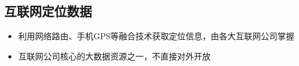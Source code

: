 \subsection{互联网定位数据}

\begin{frame}[t]{\subsecname}
\begin{itemize}
\item 利用网络路由、手机GPS等融合技术获取定位信息，由各大互联网公司掌握
\item 互联网公司核心的大数据资源之一，不直接对外开放
\end{itemize}

\begin{figure}\centering
    \captionsetup[subfigure]{labelformat=empty}
    \vspace{1pt} 
\end{figure}
\end{frame}

